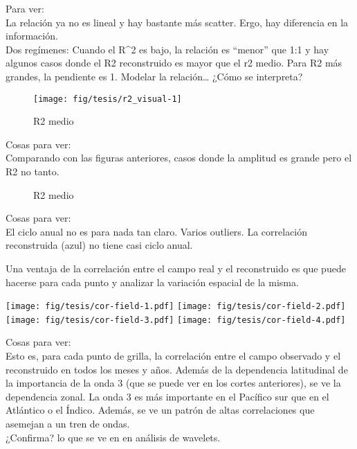 \documentclass[spanish,a4paper]{book}
\begin{document}
Para ver:\\
La relación ya no es lineal y hay bastante más scatter. Ergo, hay
diferencia en la información.\\
Dos regímenes: Cuando el R\^{}2 es bajo, la relación es ``menor'' que
1:1 y hay algunos casos donde el R2 reconstruido es mayor que el r2
medio. Para R2 más grandes, la pendiente es 1. Modelar la
relación\ldots{} ¿Cómo se interpreta?

\begin{figure*}
\texttt{[image: fig/tesis/r2\_visual-1]} \caption{R2 medio}\label{fig:r2_visual}
\end{figure*}

Cosas para ver:\\
Comparando con las figuras anteriores, casos donde la amplitud es grande
pero el R2 no tanto.

\begin{figure*}
\newline{}\caption{R2 medio}\label{fig:r2_timeseries}
\end{figure*}

Cosas para ver:\\
El ciclo anual no es para nada tan claro. Varios outliers. La
correlación reconstruida (azul) no tiene casi ciclo anual.

Una ventaja de la correlación entre el campo real y el reconstruido es
que puede hacerse para cada punto y analizar la variación espacial de la
misma.

\texttt{[image: fig/tesis/cor-field-1.pdf]}
\texttt{[image: fig/tesis/cor-field-2.pdf]}
\texttt{[image: fig/tesis/cor-field-3.pdf]}
\texttt{[image: fig/tesis/cor-field-4.pdf]}

Cosas para ver:\\
Esto es, para cada punto de grilla, la correlación entre el campo
observado y el reconstruido en todos los meses y años. Además de la
dependencia latitudinal de la importancia de la onda 3 (que se puede ver
en los cortes anteriores), se ve la dependencia zonal. La onda 3 es más
importante en el Pacífico sur que en el Atlántico o el Índico. Además,
se ve un patrón de altas correlaciones que asemejan a un tren de
ondas.\\
¿Confirma? lo que se ve en en análisis de wavelets.
\end{document}
